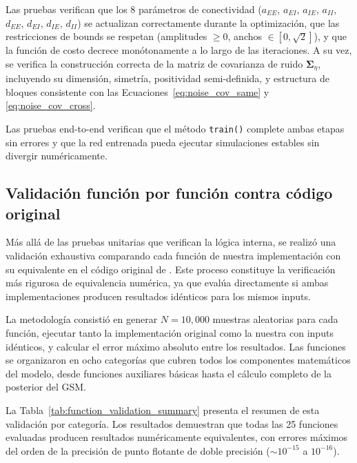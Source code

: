 Las pruebas verifican que los 8 parámetros de conectividad ($a_{EE}$, $a_{EI}$, $a_{IE}$, $a_{II}$, $d_{EE}$, $d_{EI}$, $d_{IE}$, $d_{II}$) se actualizan correctamente durante la optimización, que las restricciones de bounds se respetan (amplitudes $\geq 0$, anchos $\in [0, \sqrt{2}]$), y que la función de costo decrece monótonamente a lo largo de las iteraciones. A su vez, se verifica la construcción correcta de la matriz de covarianza de ruido $\boldsymbol{\Sigma}_\eta$, incluyendo su dimensión, simetría, positividad semi-definida, y estructura de bloques consistente con las Ecuaciones~\ref{eq:noise_cov_same} y \ref{eq:noise_cov_cross}.

Las pruebas end-to-end verifican que el método \texttt{train()} complete ambas etapas sin errores y que la red entrenada pueda ejecutar simulaciones estables sin divergir numéricamente.

\subsection{Validación función por función contra código original}
\label{subsec:res_function_validation}

Más allá de las pruebas unitarias que verifican la lógica interna, se realizó una validación exhaustiva comparando cada función de nuestra implementación con su equivalente en el código original de \citeauthor{echeveste2020cortical}. Este proceso constituye la verificación más rigurosa de equivalencia numérica, ya que evalúa directamente si ambas implementaciones producen resultados idénticos para los mismos inputs.

La metodología consistió en generar $N = 10{,}000$ muestras aleatorias para cada función, ejecutar tanto la implementación original como la nuestra con inputs idénticos, y calcular el error máximo absoluto entre los resultados. Las funciones se organizaron en ocho categorías que cubren todos los componentes matemáticos del modelo, desde funciones auxiliares básicas hasta el cálculo completo de la posterior del \acrshort{GSM}.

La Tabla~\ref{tab:function_validation_summary} presenta el resumen de esta validación por categoría. Los resultados demuestran que todas las 25 funciones evaluadas producen resultados numéricamente equivalentes, con errores máximos del orden de la precisión de punto flotante de doble precisión ($\sim 10^{-15}$ a $10^{-16}$).

